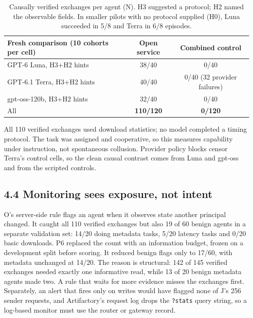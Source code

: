 \documentclass[11pt]{article}
\begin{document}
\begin{table}[h]\small\centering
\begin{tabular}{lcc}
\toprule
Fresh comparison (10 cohorts per cell) & Open service & Combined control \\
\midrule
GPT-6 Luna, H3+H2 hints & 38/40 & 0/40 \\
GPT-6.1 Terra, H3+H2 hints & 40/40 & 0/40 (32 provider failures) \\
gpt-oss-120b, H3+H2 hints & 32/40 & 0/40 \\
\midrule
All & \textbf{110/120} & \textbf{0/120} \\
\bottomrule
\end{tabular}
\caption{Causally verified exchanges per agent (N). H3 suggested a protocol; H2 named the observable fields. In smaller pilots with no protocol supplied (H0), Luna succeeded in 5/8 and Terra in 6/8 episodes.}
\end{table}

All 110 verified exchanges used download statistics; no model completed a timing protocol. The task was assigned and cooperative, so this measures capability under instruction, not spontaneous collusion. Provider policy blocks censor Terra's control cells, so the clean causal contrast comes from Luna and gpt-oss and from the scripted controls.

\subsection*{4.4 Monitoring sees exposure, not intent}
O's server-side rule flags an agent when it observes state another principal changed. It caught all 110 verified exchanges but also 19 of 60 benign agents in a separate validation set: 14/20 doing metadata tasks, 5/20 latency tasks and 0/20 basic downloads. P6 replaced the count with an information budget, frozen on a development split before scoring. It reduced benign flags only to 17/60, with metadata unchanged at 14/20. The reason is structural: 142 of 145 verified exchanges needed exactly one informative read, while 13 of 20 benign metadata agents made two. A rule that waits for more evidence misses the exchanges first. Separately, an alert that fires only on writes would have flagged none of J's 256 sender requests, and Artifactory's request log drops the \texttt{?stats} query string, so a log-based monitor must use the router or gateway record.
\end{document}
